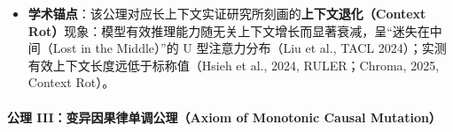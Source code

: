 \documentclass[
]{ctexart}
\renewcommand{\_}{\discretionary{}{}{\textunderscore}}
\renewcommand{\text}[1]{\textnormal{#1}}
\begin{document}
\begin{itemize}
  SNR 衰减，任务正确率 \(\approx\) 100\%；\(\rho > W^*\)
  时补偿失效，正确率陡降。实测
  \(W^*_{1.5\text{B}} \approx 32\text{k–64k} < W^*_{7\text{B}} > 131\text{k} < W^*_{\text{Kimi}} \ge 1\text{M}\)，与模型能力正相关。\textbf{违约下界
  \(P_{\text{violate}} \ge 1 - c^n\) 只在 \(\rho > W^*\)
  时传导为可观测的任务失败}；\(\rho < W^*\) 时 SNR 虽已衰减（7B 在 131k
  处 SNR 损失 44\%），但任务正确率不受影响。\(W^*\)
  是经验参数，不写入形式化接口。认识论边界见附录 B.15。
\item
  \textbf{学术锚点}：该公理对应长上下文实证研究所刻画的\textbf{上下文退化（Context
  Rot）}现象：模型有效推理能力随无关上下文增长而显著衰减，呈``迷失在中间（Lost
  in the Middle）''的 U 型注意力分布（Liu et al., TACL
  2024）；实测有效上下文长度远低于标称值（Hsieh et al., 2024,
  RULER；Chroma, 2025, Context Rot）。
\end{itemize}

\paragraph{公理 III：变异因果律单调公理（Axiom of Monotonic Causal
Mutation）}\label{ux516cux7406-iiiux53d8ux5f02ux56e0ux679cux5f8bux5355ux8c03ux516cux7406axiom-of-monotonic-causal-mutation}
\end{document}
